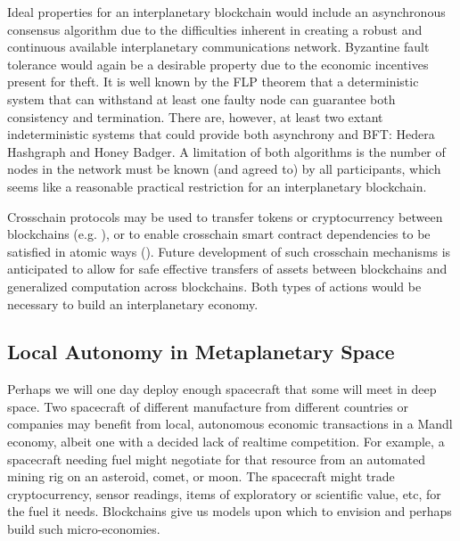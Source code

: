 \documentclass[journal ]{new-aiaa}
\begin{document}
Ideal properties for an interplanetary blockchain would include an asynchronous consensus algorithm due to the difficulties inherent in creating a robust and continuous available interplanetary communications network. Byzantine fault tolerance would again be a desirable property due to the economic incentives present for theft. It is well known by the FLP theorem\cite{fischer1982impossibility} that a deterministic system that can withstand at least one faulty node can guarantee both consistency and termination. There are, however, at least two extant indeterministic systems that could provide both asynchrony and BFT: Hedera Hashgraph\cite{baird2018hedera} and Honey Badger\cite{Miller_Xia_Croman_Shi_Song_2016}. A limitation of both algorithms is the number of nodes in the network must be known (and agreed to) by all participants, which seems like a reasonable practical restriction for an interplanetary blockchain.

Crosschain protocols may be used to transfer tokens or cryptocurrency between blockchains (e.g. \cite{thomas2015protocol,sporny-web-ledger-2019}), or to enable crosschain smart contract dependencies to be satisfied in atomic ways (\cite{robinson2019atomic}). Future development of such crosschain mechanisms is anticipated to allow for safe effective transfers of assets between blockchains and generalized computation across blockchains. Both types of actions would be necessary to build an interplanetary economy.


\subsection{Local Autonomy in Metaplanetary Space}

Perhaps we will one day deploy enough spacecraft that some will meet in deep space. Two spacecraft of different manufacture from different countries or companies may benefit from local, autonomous economic transactions in a Mandl economy, albeit one with a decided lack of realtime competition. For example, a spacecraft needing fuel might negotiate for that resource from an automated mining rig on an asteroid, comet, or moon. The spacecraft might trade cryptocurrency, sensor readings, items of exploratory or scientific value, etc, for the fuel it needs. Blockchains give us models upon which to envision and perhaps build such micro-economies.
\end{document}

